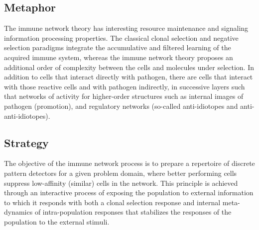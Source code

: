 \subsection{Metaphor}
The immune network theory has interesting resource maintenance and signaling information processing properties.
The classical clonal selection and negative selection paradigms integrate the accumulative and filtered learning of the acquired immune system, whereas the immune network theory proposes an additional order of complexity between the cells and molecules under selection. In addition to cells that interact directly with pathogen, there are cells that interact with those reactive cells and with pathogen indirectly, in successive layers such that networks of activity for higher-order structures such as internal images of pathogen (promotion), and regulatory networks (so-called anti-idiotopes and anti-anti-idiotopes).

\subsection{Strategy}
The objective of the immune network process is to prepare a repertoire of discrete pattern detectors for a given problem domain, where better performing cells suppress low-affinity (similar) cells in the network.
This principle is achieved through an interactive process of exposing the population to external information to which it responds with both a clonal selection response and internal meta-dynamics of intra-population responses that stabilizes the responses of the population to the external stimuli.

